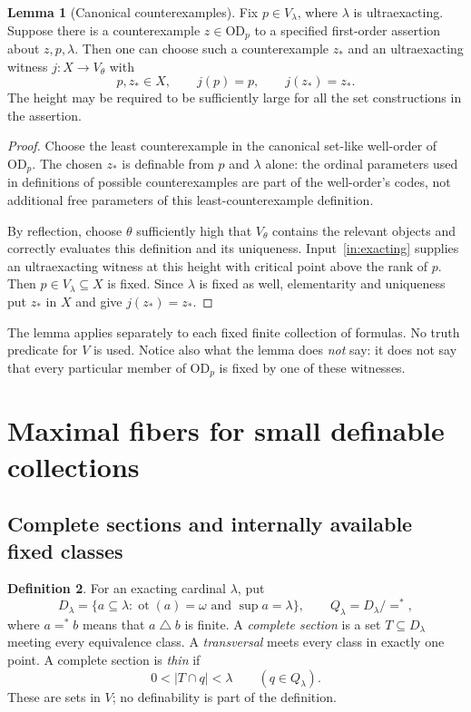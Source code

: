 \documentclass[11pt,letterpaper]{article}
\theoremstyle{definition}
\newtheorem{definition}{Definition}[section]
\newtheorem{lemma}[definition]{Lemma}
\numberwithin{equation}{section}
\newcommand{\OD}{\mathrm{OD}}
\newcommand{\ot}{\operatorname{ot}}
\begin{document}
\begin{lemma}[Canonical counterexamples]\label{lem:canonical-new}
Fix $p\in V_\lambda$, where $\lambda$ is ultraexacting. Suppose there is a counterexample $z\in\OD_p$ to a specified first-order assertion about $z,p,\lambda$. Then one can choose such a counterexample $z_*$ and an ultraexacting witness $j:X\to V_\theta$ with
\[
p,z_*\in X,\qquad j(p)=p,\qquad j(z_*)=z_*.
\]
The height may be required to be sufficiently large for all the set constructions in the assertion.
\end{lemma}

\begin{proof}
Choose the least counterexample in the canonical set-like well-order of $\OD_p$. The chosen $z_*$ is definable from $p$ and $\lambda$ alone: the ordinal parameters used in definitions of possible counterexamples are part of the well-order's codes, not additional free parameters of this least-counterexample definition.

By reflection, choose $\theta$ sufficiently high that $V_\theta$ contains the relevant objects and correctly evaluates this definition and its uniqueness. Input~\ref{in:exacting} supplies an ultraexacting witness at this height with critical point above the rank of $p$. Then $p\in V_\lambda\subseteq X$ is fixed. Since $\lambda$ is fixed as well, elementarity and uniqueness put $z_*$ in $X$ and give $j(z_*)=z_*$.
\end{proof}

The lemma applies separately to each fixed finite collection of formulas. No truth predicate for $V$ is used. Notice also what the lemma does \emph{not} say: it does not say that every particular member of $\OD_p$ is fixed by one of these witnesses.

\section{Maximal fibers for small definable collections}\label{sec:fibers}

\subsection{Complete sections and internally available fixed classes}

\begin{definition}
For an exacting cardinal $\lambda$, put
\[
D_\lambda=\{a\subseteq\lambda:\ot(a)=\omega\text{ and }\sup a=\lambda\},
\qquad
Q_\lambda=D_\lambda/{=^*},
\]
where $a=^*b$ means that $a\mathbin\triangle b$ is finite. A \emph{complete section} is a set $T\subseteq D_\lambda$ meeting every equivalence class. A \emph{transversal} meets every class in exactly one point. A complete section is \emph{thin} if
\[
0<|T\cap q|<\lambda\qquad(q\in Q_\lambda).
\]
These are sets in $V$; no definability is part of the definition.
\end{definition}
\end{document}
